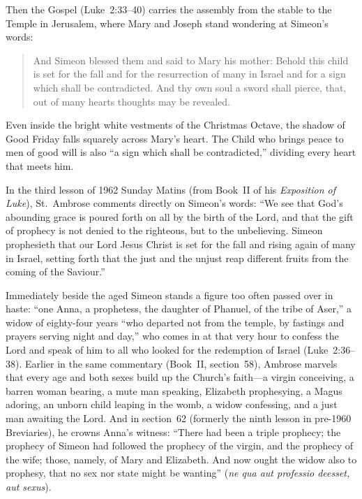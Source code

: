 Then the Gospel (Luke~2:33--40) carries the assembly from the stable to the
Temple in Jerusalem, where Mary and Joseph stand wondering at Simeon's words:

\begin{quote}
And Simeon blessed them and said to Mary his mother: Behold this child is set
for the fall and for the resurrection of many in Israel and for a sign which
shall be contradicted. And thy own soul a sword shall pierce, that, out of many
hearts thoughts may be revealed.
\end{quote}

Even inside the bright white vestments of the Christmas Octave, the shadow of
Good Friday falls squarely across Mary's heart. The Child who brings peace to
men of good will is also ``a sign which shall be contradicted,'' dividing every
heart that meets him.

In the third lesson of 1962 Sunday Matins (from Book~II of his
\textit{Exposition of Luke}), St.~Ambrose comments directly on Simeon's words:
``We see that God's abounding grace is poured forth on all by the birth of the
Lord, and that the gift of prophecy is not denied to the righteous, but to the
unbelieving. Simeon prophesieth that our Lord Jesus Christ is set for the fall
and rising again of many in Israel, setting forth that the just and the unjust
reap different fruits from the coming of the Saviour.''

Immediately beside the aged Simeon stands a figure too often passed over in
haste: ``one Anna, a prophetess, the daughter of Phanuel, of the tribe of Aser,''
a widow of eighty-four years ``who departed not from the temple, by fastings and
prayers serving night and day,'' who comes in at that very hour to confess the
Lord and speak of him to all who looked for the redemption of Israel
(Luke~2:36--38). Earlier in the same commentary (Book~II, section~58), Ambrose
marvels that every age and both sexes build up the Church's faith---a virgin
conceiving, a barren woman bearing, a mute man speaking, Elizabeth prophesying,
a Magus adoring, an unborn child leaping in the womb, a widow confessing, and a
just man awaiting the Lord. And in section~62 (formerly the ninth lesson in
pre-1960 Breviaries), he crowns Anna's witness: ``There had been a triple
prophecy; the prophecy of Simeon had followed the prophecy of the virgin, and
the prophecy of the wife; those, namely, of Mary and Elizabeth. And now ought
the widow also to prophesy, that no sex nor state might be wanting''
(\textit{ne qua aut professio deesset, aut sexus}).

